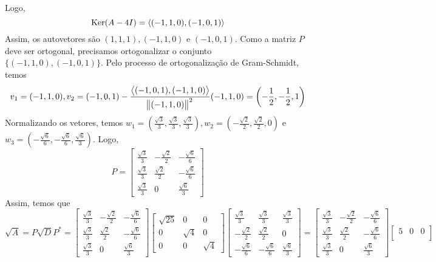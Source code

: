 \documentclass[11pt,a4paper]{article}
\begin{document}
{\[\]
Logo, 
\[
\operatorname{Ker}(A - 4I) = \langle (-1,1,0), (-1,0,1) \rangle
\]
Assim, os autovetores são $(1,1,1),(-1,1,0)$ e $(-1,0,1).$ Como a matriz $P$ deve ser ortogonal, precisamos ortogonalizar o conjunto $\{ (-1,1,0),(-1,0,1)\}.$ Pelo processo de ortogonalização de Gram-Schmidt, temos
\[
v_1 =  (-1,1,0), v_2 = (-1,0,1) - \frac{\left\langle (-1,0,1),(-1,1,0) \right\rangle}{\norm{(-1,1,0)}^2}(-1,1,0) = \left(- \frac{1}{2}, - \frac{1}{2}, 1  \right) 
\]
Normalizando os vetores, temos $w_1 = \left( \frac{\sqrt{3}}{3}, \frac{\sqrt{3}}{3}, \frac{\sqrt{3}}{3} \right), w_2 = \left( - \frac{\sqrt{2}}{2}, \frac{\sqrt{2}}{2}, 0 \right)$ e $w_3 = \left( - \frac{\sqrt{6}}{6}, - \frac{\sqrt{6}}{6},  \frac{\sqrt{6}}{3}  \right).$
Logo, 
\[
P = \begin{bmatrix}
 \frac{\sqrt{3}}{3} & - \frac{\sqrt{2}}{2} & - \frac{\sqrt{6}}{6} \\
 \frac{\sqrt{3}}{3} & \frac{\sqrt{2}}{2} & - \frac{\sqrt{6}}{6} \\
 \frac{\sqrt{3}}{3} & 0 &  \frac{\sqrt{6}}{3}  
\end{bmatrix}
\]
Assim, temos que
\[
\sqrt{A} = P\sqrt{D}P^{*} =  \begin{bmatrix}
 \frac{\sqrt{3}}{3} & - \frac{\sqrt{2}}{2} & - \frac{\sqrt{6}}{6} \\
 \frac{\sqrt{3}}{3} & \frac{\sqrt{2}}{2} & - \frac{\sqrt{6}}{6} \\
 \frac{\sqrt{3}}{3} & 0 &  \frac{\sqrt{6}}{3}  
\end{bmatrix}\begin{bmatrix}
\sqrt{25} & 0 & 0 \\
0 & \sqrt{4} & 0 \\
0 & 0 & \sqrt{4} 
\end{bmatrix}\begin{bmatrix}
 \frac{\sqrt{3}}{3} &  \frac{\sqrt{3}}{3}  &  \frac{\sqrt{3}}{3} \\
- \frac{\sqrt{2}}{2} &\frac{\sqrt{2}}{2} & 0 \\
- \frac{\sqrt{6}}{6} & - \frac{\sqrt{6}}{6}&  \frac{\sqrt{6}}{3}  
\end{bmatrix} = \begin{bmatrix}
 \frac{\sqrt{3}}{3} & - \frac{\sqrt{2}}{2} & - \frac{\sqrt{6}}{6} \\
 \frac{\sqrt{3}}{3} & \frac{\sqrt{2}}{2} & - \frac{\sqrt{6}}{6} \\
 \frac{\sqrt{3}}{3} & 0 &  \frac{\sqrt{6}}{3}  
\end{bmatrix}\begin{bmatrix}
5 & 0 & 0 \\

\end{bmatrix}\]}
\end{document}
